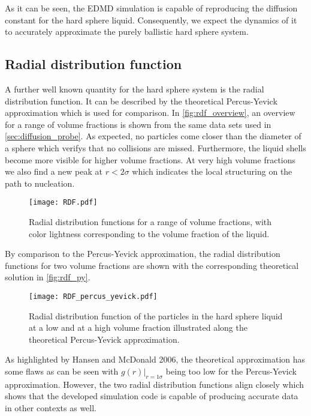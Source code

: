 As it can be seen, the EDMD simulation is capable of reproducing the diffusion constant for the hard sphere liquid. Consequently, we expect the dynamics of it to accurately approximate the purely ballistic hard sphere system.

\subsection{Radial distribution function}
\label{sec:RDF_prob}
A further well known quantity for the hard sphere system is the radial distribution function. It can be described by the theoretical Percus-Yevick approximation which is used for comparison. In \autoref{fig:rdf_overview}, an overview for a range of volume fractions is shown from the same data sets used in \autoref{sec:diffusion_probe}. As expected, no particles come closer than the diameter of a sphere which verifys that no collisions are missed. Furthermore, the liquid shells become more visible for higher volume fractions. At very high volume fractions we also find a new peak at $r < 2 \sigma$ which indicates the local structuring on the path to nucleation.
\begin{figure}[h]
\centering
\texttt{[image: RDF.pdf]}
\caption[Radial distribution functions at varying volume fractions]{Radial distribution functions for a range of volume fractions, with color lightness corresponding to the volume fraction of the liquid.}
\label{fig:rdf_overview}
\end{figure}
By comparison to the Percus-Yevick approximation, the radial distribution functions for two volume fractions are shown with the corresponding theoretical solution in \autoref{fig:rdf_py}.
\begin{figure}[h]
\centering
\texttt{[image: RDF\_percus\_yevick.pdf]}
\caption[Radial distribution function with Percus-Yevick approximation]{Radial distribution function of the particles in the hard sphere liquid at a low and at a high volume fraction illustrated along the theoretical Percus-Yevick approximation.}
\label{fig:rdf_py}
\end{figure}
As highlighted by Hansen and McDonald 2006\cite{Hansen2006}, the theoretical approximation has some flaws as can be seen with $g(r)|_{r=1\sigma}$ being too low for the Percus-Yevick approximation. However, the two radial distribution functions align closely which shows that the developed simulation code is capable of producing accurate data in other contexts as well.

